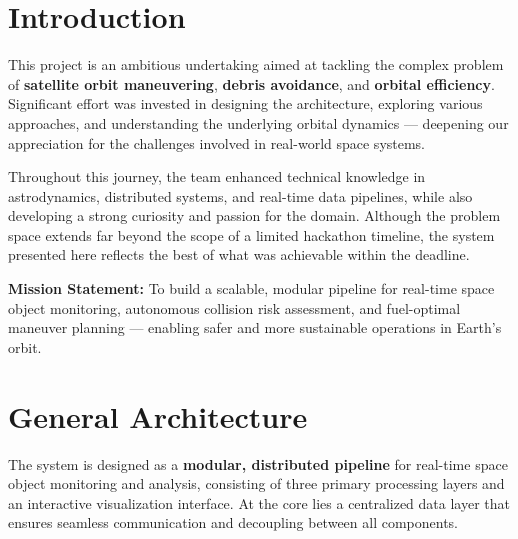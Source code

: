 \documentclass[11pt, a4paper]{article}
\newcommand{\keyword}[1]{\textcolor{orbitcyan}{\textbf{#1}}}
\begin{document}
\tableofcontents
\newpage

\section{Introduction}

This project is an ambitious undertaking aimed at tackling the complex problem of
\keyword{satellite orbit maneuvering}, \keyword{debris avoidance}, and \keyword{orbital efficiency}.
Significant effort was invested in designing the architecture, exploring various approaches, and
understanding the underlying orbital dynamics --- deepening our appreciation for the challenges
involved in real-world space systems.

Throughout this journey, the team enhanced technical knowledge in astrodynamics, distributed
systems, and real-time data pipelines, while also developing a strong curiosity and passion for the
domain. Although the problem space extends far beyond the scope of a limited hackathon timeline,
the system presented here reflects the best of what was achievable within the deadline.

\begin{infobox}
\textbf{Mission Statement:} To build a scalable, modular pipeline for real-time space object
monitoring, autonomous collision risk assessment, and fuel-optimal maneuver planning ---
enabling safer and more sustainable operations in Earth's orbit.
\end{infobox}

\section{General Architecture}

The system is designed as a \keyword{modular, distributed pipeline} for real-time space object
monitoring and analysis, consisting of three primary processing layers and an interactive
visualization interface. At the core lies a centralized data layer that ensures seamless
communication and decoupling between all components.
\end{document}
